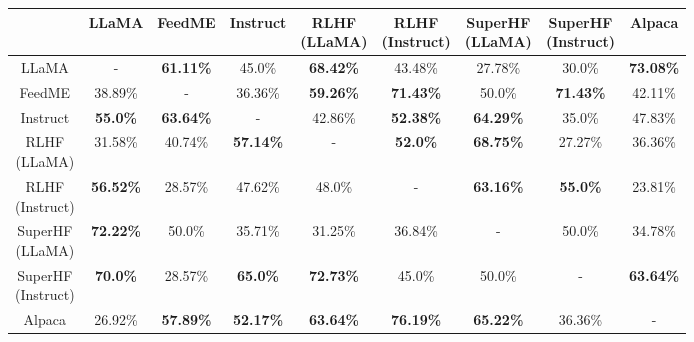 \begin{tabular}{|c|c|c|c|c|c|c|c|c|}
\hline
 & \makecell{LLaMA\\\phantom{space}} & \makecell{FeedME\\\phantom{space}} & \makecell{Instruct\\\phantom{space}} & \makecell{RLHF\\(LLaMA)} & \makecell{RLHF\\(Instruct)} & \makecell{SuperHF\\(LLaMA)} & \makecell{SuperHF\\(Instruct)} & \makecell{Alpaca\\\phantom{space}} \\
\hline
\makecell{LLaMA\\\phantom{space}} & - & \textbf{61.11\%} & 45.0\% & \textbf{68.42\%} & 43.48\% & 27.78\% & 30.0\% & \textbf{73.08\%} \\
\hline
\makecell{FeedME\\\phantom{space}} & 38.89\% & - & 36.36\% & \textbf{59.26\%} & \textbf{71.43\%} & 50.0\% & \textbf{71.43\%} & 42.11\% \\
\hline
\makecell{Instruct\\\phantom{space}} & \textbf{55.0\%} & \textbf{63.64\%} & - & 42.86\% & \textbf{52.38\%} & \textbf{64.29\%} & 35.0\% & 47.83\% \\
\hline
\makecell{RLHF\\(LLaMA)} & 31.58\% & 40.74\% & \textbf{57.14\%} & - & \textbf{52.0\%} & \textbf{68.75\%} & 27.27\% & 36.36\% \\
\hline
\makecell{RLHF\\(Instruct)} & \textbf{56.52\%} & 28.57\% & 47.62\% & 48.0\% & - & \textbf{63.16\%} & \textbf{55.0\%} & 23.81\% \\
\hline
\makecell{SuperHF\\(LLaMA)} & \textbf{72.22\%} & 50.0\% & 35.71\% & 31.25\% & 36.84\% & - & 50.0\% & 34.78\% \\
\hline
\makecell{SuperHF\\(Instruct)} & \textbf{70.0\%} & 28.57\% & \textbf{65.0\%} & \textbf{72.73\%} & 45.0\% & 50.0\% & - & \textbf{63.64\%} \\
\hline
\makecell{Alpaca\\\phantom{space}} & 26.92\% & \textbf{57.89\%} & \textbf{52.17\%} & \textbf{63.64\%} & \textbf{76.19\%} & \textbf{65.22\%} & 36.36\% & - \\
\hline
\end{tabular}
